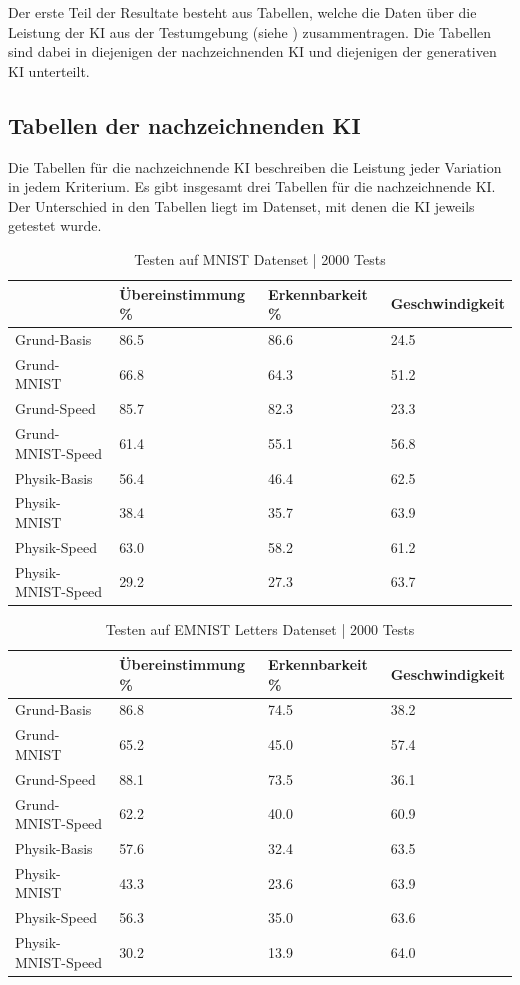 Der erste Teil der Resultate besteht aus Tabellen, welche die Daten über die
Leistung der KI aus der Testumgebung (siehe ) zusammentragen. Die Tabellen sind dabei in
diejenigen der nachzeichnenden KI und diejenigen der generativen KI unterteilt.

\subsection{Tabellen der nachzeichnenden KI}\label{sub:r_tab_nachzeich}
Die Tabellen für die nachzeichnende KI beschreiben die Leistung jeder Variation
in jedem Kriterium. Es gibt insgesamt drei Tabellen für die nachzeichnende KI.
Der Unterschied in den Tabellen liegt im Datenset, mit denen die KI jeweils
getestet wurde.

\begin{table}[!ht]
    \centering
    \caption{Testen auf MNIST Datenset | 2000 Tests}\label{tab:MNIST}
    \begin{tabular}{|l|l|l|l|}
        \hline
            ~ & Übereinstimmung \% & Erkennbarkeit \% & Geschwindigkeit \\ \hline
            Grund-Basis & 86.5 & 86.6 & 24.5 \\ \hline
            Grund-MNIST & 66.8 & 64.3 & 51.2 \\ \hline
            Grund-Speed & 85.7 & 82.3 & 23.3 \\ \hline
            Grund-MNIST-Speed & 61.4 & 55.1 & 56.8 \\ \hline
            Physik-Basis & 56.4 & 46.4 & 62.5 \\ \hline
            Physik-MNIST & 38.4 & 35.7 & 63.9 \\ \hline
            Physik-Speed & 63.0 & 58.2 & 61.2 \\ \hline
            Physik-MNIST-Speed & 29.2 & 27.3 & 63.7 \\ \hline
        \end{tabular}
\end{table}

\begin{table}[!ht]
    \centering
    \caption{Testen auf EMNIST Letters Datenset | 2000 Tests}\label{tab:EMNIST}
    \begin{tabular}{|l|l|l|l|}
    \hline
        ~ & Übereinstimmung \% & Erkennbarkeit \% & Geschwindigkeit \\ \hline
        Grund-Basis & 86.8 & 74.5 & 38.2 \\ \hline
        Grund-MNIST & 65.2 & 45.0 & 57.4 \\ \hline
        Grund-Speed & 88.1 & 73.5 & 36.1 \\ \hline
        Grund-MNIST-Speed & 62.2 & 40.0 & 60.9 \\ \hline
        Physik-Basis & 57.6 & 32.4 & 63.5 \\ \hline
        Physik-MNIST & 43.3 & 23.6 & 63.9 \\ \hline
        Physik-Speed & 56.3 & 35.0 & 63.6 \\ \hline
        Physik-MNIST-Speed & 30.2 & 13.9 & 64.0 \\ \hline
    \end{tabular}
\end{table}

